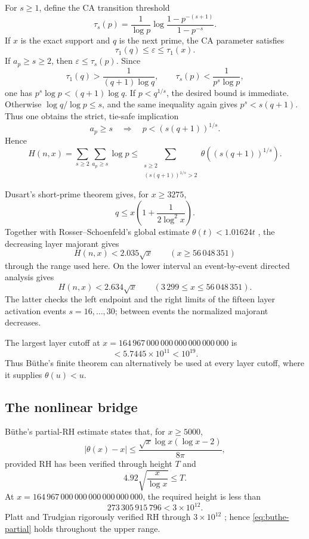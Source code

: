\documentclass[11pt,a4paper]{article}
\numberwithin{equation}{section}
\theoremstyle{definition}
\newcommand{\Xmin}{3\,299}
\newcommand{\Xdirect}{56\,048\,351}
\newcommand{\Xmax}{164\,967\,000\,000\,000\,000\,000\,000}
\begin{document}
For \(s\ge1\), define the CA transition threshold
\[
  \tau_s(p)
  =
  \frac1{\log p}
  \log\frac{1-p^{-(s+1)}}{1-p^{-s}}.
\]
If \(x\) is the exact support and \(q\) is the next prime, the CA parameter
satisfies
\[
  \tau_1(q)\le\varepsilon\le\tau_1(x).
\]
If \(a_p\ge s\ge2\), then \(\varepsilon\le\tau_s(p)\).  Since
\[
  \tau_1(q)>\frac1{(q+1)\log q},
  \qquad
  \tau_s(p)<\frac1{p^s\log p},
\]
one has \(p^s\log p<(q+1)\log q\).  If \(p<q^{1/s}\), the desired
bound is immediate.  Otherwise \(\log q/\log p\le s\), and the same
inequality again gives \(p^s<s(q+1)\).  Thus one obtains the strict,
tie-safe implication
\begin{equation}\label{eq:layer-cutoff}
  a_p\ge s
  \quad\Longrightarrow\quad
  p<(s(q+1))^{1/s}.
\end{equation}
Hence
\[
  H(n,x)
  =
  \sum_{s\ge2}\sum_{a_p\ge s}\log p
  \le
  \sum_{\substack{s\ge2\\(s(q+1))^{1/s}>2}}
  \theta\left((s(q+1))^{1/s}\right).
\]

Dusart's short-prime theorem \cite{dusartprime1999} gives, for \(x\ge3275\),
\[
  q\le x\left(1+\frac1{2\log^2x}\right).
\]
Together with Rosser--Schoenfeld's global estimate
\(\theta(t)<1.01624t\) \cite{rosserschoenfeld1962}, the decreasing
layer majorant gives
\begin{equation}\label{eq:H-upper-large}
  H(n,x)<2.035\sqrt{x}
  \qquad(x\ge\Xdirect)
\end{equation}
through the range used here.  On the lower interval an event-by-event
directed analysis gives
\begin{equation}\label{eq:H-upper-small}
  H(n,x)<2.634\sqrt{x}
  \qquad(\Xmin\le x\le\Xdirect).
\end{equation}
The latter checks the left endpoint and the right limits of the fifteen layer
activation events \(s=16,\ldots,30\); between events the normalized
majorant decreases.

The largest layer cutoff at \(x=\Xmax\) is
\[
  <5.7445\times10^{11}<10^{19}.
\]
Thus B\"uthe's finite theorem \cite{buthe2018} can alternatively be used at
every layer cutoff, where it supplies \(\theta(u)<u\).

\subsection{The nonlinear bridge}

B\"uthe's partial-RH estimate \cite{buthe2016} states that, for \(x\ge5000\),
\begin{equation}\label{eq:buthe-partial}
  |\theta(x)-x|
  \le
  \frac{\sqrt{x}\log x(\log x-2)}{8\pi},
\end{equation}
provided RH has been verified through height \(T\) and
\[
  4.92\sqrt{\frac{x}{\log x}}\le T.
\]
At \(x=\Xmax\), the required height is less than
\[
  273\,305\,915\,796<3\times10^{12}.
\]
Platt and Trudgian rigorously verified RH through
\(3\times10^{12}\) \cite{platttrudgian2021}; hence
\eqref{eq:buthe-partial} holds throughout the upper range.
\end{document}

